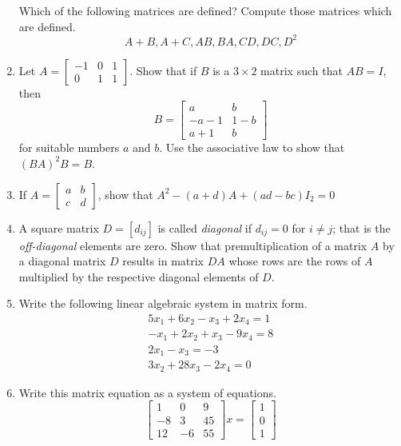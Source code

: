 \documentclass[../main.tex]{subfiles}
\begin{document}
\begin{enumerate}[label=\textbf{1.\arabic*}]
Which of the following matrices are defined? Compute those matrices which are defined.
$$
A+B, A+C, A B, B A, C D, D C, D^{2}
$$

\item  Let $A=\left[\begin{array}{ccc}-1 & 0 & 1 \\ 0 & 1 & 1\end{array}\right]$. Show that if $B$ is a $3 \times 2$ matrix such that $A B=I$, then
$$
B=\left[\begin{array}{ll}
a & b \\
-a-1 & 1-b \\
a+1 & b
\end{array}\right]
$$
for suitable numbers $a$ and $b$. Use the associative law to show that $(B A)^{2} B=B$.

\item If $A=\left[\begin{array}{ll}a & b \\ c & d\end{array}\right]$, show that $A^{2}-(a+d) A+(a d-b c) I_{2}=0$

\item A square matrix $D=\left[d_{i j}\right]$ is called \emph{diagonal} if $d_{i j}=0$ for $i \neq j$; that is the \emph{off-diagonal} elements are zero. Show that premultiplication of a matrix $A$ by a diagonal matrix $D$ results in matrix $D A$ whose rows are the rows of $A$ multiplied by the respective diagonal elements of $D$.

\item Write the following linear algebraic system in matrix form.
$$
\begin{array}{r}
5 x_{1}+6 x_{2}-x_{3}+2 x_{4}=1 \\
-x_{1}+2 x_{2}+x_{3}-9 x_{4}=8 \\
2 x_{1}-x_{3}=-3 \\
3 x_{2}+28 x_{3}-2 x_{4}=0
\end{array}
$$

\item Write this matrix equation as a system of equations.
$$
\left[\begin{array}{ccc}
1 & 0 & 9 \\
-8 & 3 & 45 \\
12 & -6 & 55
\end{array}\right] x=\left[\begin{array}{l}
1 \\
0 \\
1
\end{array}\right]
$$



\end{enumerate}
\end{document}
